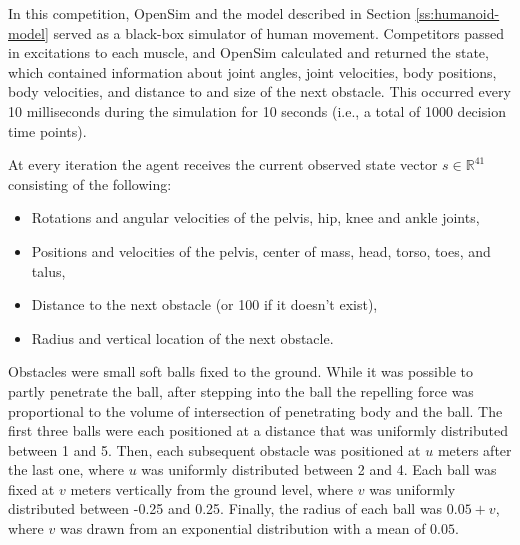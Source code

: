 \documentclass[graybox]{svmult}
\begin{document}
In this competition, OpenSim and the model described in Section \ref{ss:humanoid-model} served as a black-box simulator of human movement. Competitors passed in excitations to each muscle, and OpenSim calculated and returned the state, which contained information about joint angles, joint velocities, body positions, body velocities, and distance to and size of the next obstacle. This occurred every 10 milliseconds during the simulation for 10 seconds (i.e., a total of 1000 decision time points).


At every iteration the agent receives the current observed state vector $s \in \mathbb{R}^{41}$ consisting of the following:
\begin{itemize}
\item Rotations and angular velocities of the pelvis, hip, knee and ankle joints,
\item Positions and velocities of the pelvis, center of mass, head, torso, toes, and talus, 
\item Distance to the next obstacle (or 100 if it doesn't exist),
\item Radius and vertical location of the next obstacle.
\end{itemize}

Obstacles were small soft balls fixed to the ground. While it was possible to partly penetrate the ball, after stepping into the ball the repelling force was proportional to the volume of intersection of penetrating body and the ball. The first three balls were each positioned at a distance that was uniformly distributed between 1 and 5. Then, each subsequent obstacle was positioned at $u$ meters after the last one, where $u$ was uniformly distributed between 2 and 4. Each ball was fixed at $v$ meters vertically from the ground level, where $v$ was uniformly distributed between -0.25 and 0.25. Finally, the radius of each ball was $0.05 + v$, where $v$ was drawn from an exponential distribution with a mean of $0.05$. 
\end{document}
